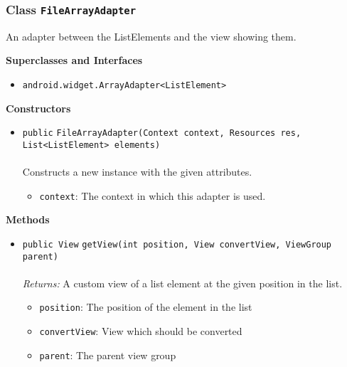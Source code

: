\subsubsection{Class \lstinline|FileArrayAdapter|}
An adapter between the ListElements and the view showing them. \\
\noindent\begin{minipage}[t]{5cm}
\vspace{0.3em}
\hspace*{2em}
\vspace{0.3em}
\end{minipage}



\textbf{\sffamily Superclasses and Interfaces}
\begin{itemize}
\item \lstinline|android.widget.ArrayAdapter<ListElement>|
\end{itemize}


\textbf{\sffamily Constructors}
\begin{itemize}
\item \lstinline|public| \lstinline|FileArrayAdapter|\lstinline|(Context context, Resources res, List<ListElement> elements)|\\ \\[-0.6em]
Constructs a new instance with the given attributes.
\begin{itemize}
\item \lstinline|context|: The context in which this adapter is used.
\end{itemize}



\end{itemize}


\textbf{\sffamily Methods}
\begin{itemize}
\item \lstinline|public View| \lstinline|getView|\lstinline|(int position, View convertView, ViewGroup parent)|\\ \\[-0.6em]
\emph{Returns:} A custom view of a list element at the given position in the list.
\begin{itemize}
\item \lstinline|position|: The position of the element in the list
\item \lstinline|convertView|: View which should be converted
\item \lstinline|parent|: The parent view group
\end{itemize}



\end{itemize}

